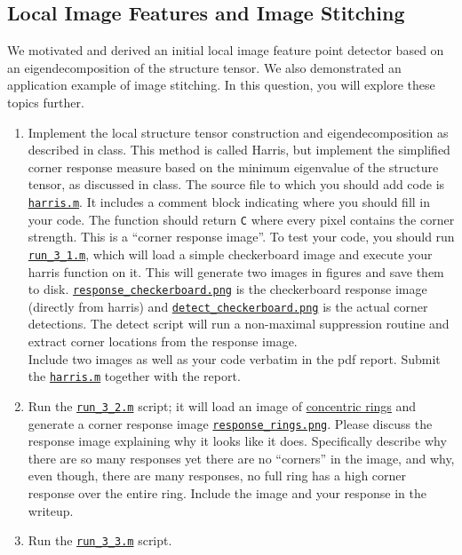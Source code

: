 \subsection{Local Image Features and Image Stitching}
We motivated and derived an initial local image feature point detector based on an eigendecomposition of the structure tensor.
We also demonstrated an application example of image stitching.
In this question, you will explore these topics further.
\begin{enumerate}
\item Implement the local structure tensor construction and eigendecomposition as described in class.
		This method is called Harris, but implement the simplified corner response measure based on the minimum eigenvalue of the structure tensor, as discussed in class.
		The source file to which you should add code is \href{./hw2/problem3/harris.m}{\texttt{harris.m}}.
		It includes a comment block indicating where you should fill in your code.
		The function should return \texttt{C} where every pixel contains the corner strength.
		This is a ``corner response image''.
		To test your code, you should run \href{./hw2/problem3/run_3_1.m}{\texttt{run\_3\_1.m}}, which will load a simple checkerboard image and execute your harris function on it.
		This will generate two images in figures and save them to disk.
		\href{./hw2/problem3/response_checkerboard.png}{\texttt{response\_checkerboard.png}} is the checkerboard response image (directly from harris) and \href{./hw2/problem3/detect_checkerboard.png}{\texttt{detect\_checkerboard.png}} is the actual corner detections.
		The detect script will run a non-maximal suppression routine and extract corner locations from the response image.\\
		Include two images as well as your code verbatim in the pdf report.
		Submit the \href{./hw2/problem3/harris.m}{\texttt{harris.m}} together with the report.
\item Run the \href{./hw2/problem3/run_3_2.m}{\texttt{run\_3\_2.m}} script; it will load an image of \href{./hw2/problem3/rings.png}{concentric rings} and generate a corner response image \href{./hw2/problem3/response_rings.png}{\texttt{response\_rings.png}}.
		Please discuss the response image explaining why it looks like it does.
		Specifically describe why there are so many responses yet there are no ``corners'' in the image, and why, even though, there are many responses, no full ring has a high corner response over the entire ring.
		Include the image and your response in the writeup.
\item Run the \href{./hw2/problem3/run_3_3.m}{\texttt{run\_3\_3.m}} script.

\end{enumerate}
